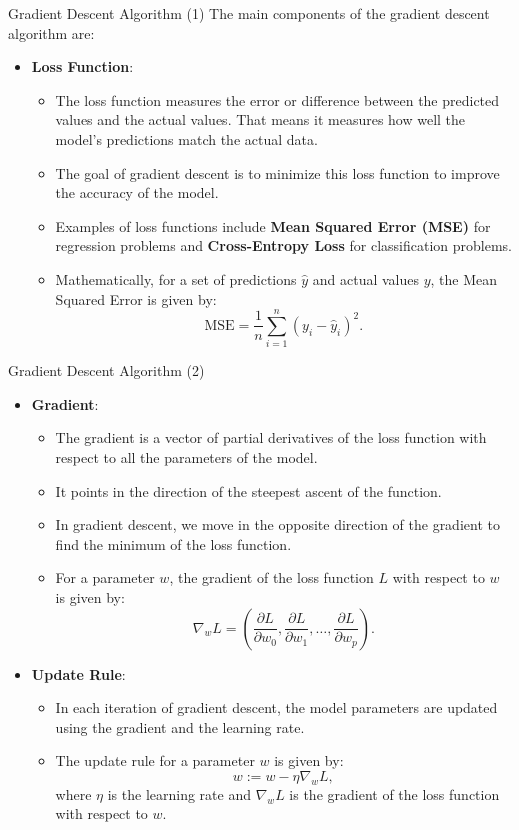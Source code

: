 \documentclass[10pt, hyperref={colorlinks = true,linkcolor = blue}]{beamer}
\begin{document}
{{\begin{frame}{Gradient Descent Algorithm (1)}
  The main components of the gradient descent algorithm are:
 \begin{itemize}[<+->]
    \item \textbf{Loss Function}:
    \begin{itemize}
        \item The loss function measures the error or difference between the predicted values and the actual values. That means it measures how well the model's predictions match the actual data.
        \item The goal of gradient descent is to minimize this loss function to improve the accuracy of the model.
        \item Examples of loss functions include \textbf{Mean Squared Error (MSE)} for regression problems and \textbf{Cross-Entropy Loss} for classification problems.
        \item Mathematically, for a set of predictions \(\hat{y}\) and actual values \(y\), the Mean Squared Error is given by:
        \[
        \text{MSE} = \frac{1}{n} \sum_{i=1}^{n} (y_i - \hat{y}_i)^2.
        \]
\end{itemize}
      \end{itemize}
 \end{frame}
 
 \begin{frame}{Gradient Descent Algorithm (2)}
 \begin{itemize}[<+->]
  \item \textbf{Gradient}:
    \begin{itemize}
        \item The gradient is a vector of partial derivatives of the loss function with respect to all the parameters of the model.
        \item It points in the direction of the steepest ascent of the function.
        \item In gradient descent, we move in the opposite direction of the gradient to find the minimum of the loss function.
        \item For a parameter \(w\), the gradient of the loss function \(L\) with respect to \(w\) is given by:
        \[
        \nabla_w L = \left( \frac{\partial L}{\partial w_0}, \frac{\partial L}{\partial w_1}, \ldots, \frac{\partial L}{\partial w_p} \right).
        \]
    \end{itemize}
     \item \textbf{Update Rule}:
    \begin{itemize}
        \item In each iteration of gradient descent, the model parameters are updated using the gradient and the learning rate.
        \item The update rule for a parameter \(w\) is given by:
        \[
        w := w - \eta \nabla_w L,
        \]
        where \(\eta\) is the learning rate and \(\nabla_w L\) is the gradient of the loss function with respect to \(w\).
    \end{itemize}
    \end{itemize}
\end{frame}


}}
\end{document}

